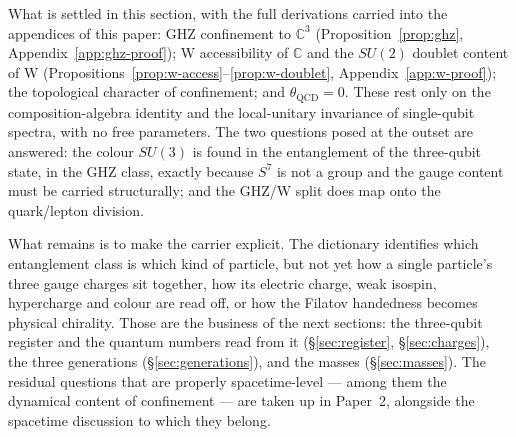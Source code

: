 What is settled in this section, with the full derivations carried into the appendices of this paper:
GHZ confinement to $\mathbb{C}^3$ (Proposition~\ref{prop:ghz}, Appendix~\ref{app:ghz-proof}); W
accessibility of $\mathbb{C}$ and the $SU(2)$ doublet content of W
(Propositions~\ref{prop:w-access}--\ref{prop:w-doublet}, Appendix~\ref{app:w-proof}); the topological
character of confinement; and $\theta_{\mathrm{QCD}} = 0$. These rest only on the composition-algebra
identity and the local-unitary invariance of single-qubit spectra, with no free parameters. The two
questions posed at the outset are answered: the colour $SU(3)$ is found in the entanglement of the
three-qubit state, in the GHZ class, exactly because $S^7$ is not a group and the gauge content must
be carried structurally; and the GHZ/W split does map onto the quark/lepton division.

What remains is to make the carrier explicit. The dictionary identifies which entanglement class is
which kind of particle, but not yet how a single particle's three gauge charges sit together, how its
electric charge, weak isospin, hypercharge and colour are read off, or how the Filatov handedness
becomes physical chirality. Those are the business of the next sections: the three-qubit register and
the quantum numbers read from it (\S\ref{sec:register}, \S\ref{sec:charges}), the three generations
(\S\ref{sec:generations}), and the masses (\S\ref{sec:masses}). The residual questions that are
properly spacetime-level --- among them the dynamical content of confinement --- are taken up in
Paper~2, alongside the spacetime discussion to which they belong.
